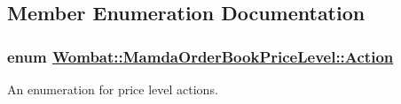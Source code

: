 \subsection{Member Enumeration Documentation}
\hypertarget{classWombat_1_1MamdaOrderBookPriceLevel_bd3407b4250fc6f7a42d94b6d32e358a}{
\subsubsection[Action]{\setlength{\rightskip}{0pt plus 5cm}enum \hyperlink{classWombat_1_1MamdaOrderBookPriceLevel_bd3407b4250fc6f7a42d94b6d32e358a}{Wombat::Mamda\-Order\-Book\-Price\-Level::Action}}}
\label{classWombat_1_1MamdaOrderBookPriceLevel_bd3407b4250fc6f7a42d94b6d32e358a}


An enumeration for price level actions. 

